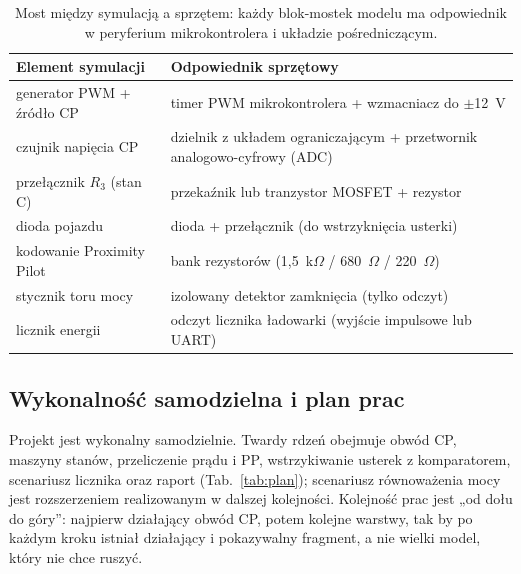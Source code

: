 \documentclass[11pt]{article}
\begin{document}
\begin{table}[h]
\centering
\begin{tabularx}{\linewidth}{@{}X X@{}}
\toprule
\textbf{Element symulacji} & \textbf{Odpowiednik sprzętowy} \\
\midrule
generator PWM + źródło CP & timer PWM mikrokontrolera + wzmacniacz do $\pm$12~V \\
czujnik napięcia CP & dzielnik z układem ograniczającym + przetwornik analogowo-cyfrowy (ADC) \\
przełącznik $R_3$ (stan C) & przekaźnik lub tranzystor MOSFET + rezystor \\
dioda pojazdu & dioda + przełącznik (do wstrzyknięcia usterki) \\
kodowanie Proximity Pilot & bank rezystorów (1,5~k$\Omega$ / 680~$\Omega$ / 220~$\Omega$) \\
stycznik toru mocy & izolowany detektor zamknięcia (tylko odczyt) \\
licznik energii & odczyt licznika ładowarki (wyjście impulsowe lub UART) \\
\bottomrule
\end{tabularx}
\caption{Most między symulacją a sprzętem: każdy blok-mostek modelu ma odpowiednik w peryferium mikrokontrolera i układzie pośredniczącym.}
\label{tab:hil}
\end{table}

\subsection{Wykonalność samodzielna i plan prac}

Projekt jest wykonalny samodzielnie. Twardy rdzeń obejmuje obwód CP, maszyny stanów, przeliczenie prądu i PP, wstrzykiwanie usterek z komparatorem, scenariusz licznika oraz raport (Tab.~\ref{tab:plan}); scenariusz równoważenia mocy jest rozszerzeniem realizowanym w dalszej kolejności. Kolejność prac jest „od dołu do góry”: najpierw działający obwód CP, potem kolejne warstwy, tak by po każdym kroku istniał działający i pokazywalny fragment, a nie wielki model, który nie chce ruszyć.
\end{document}
